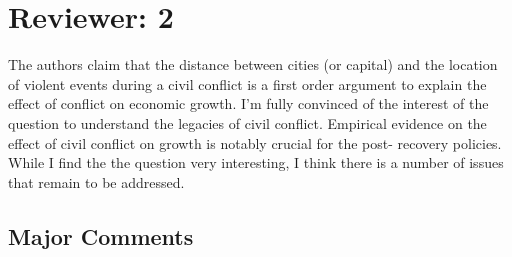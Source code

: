 \section{Reviewer: 2}
The authors claim that the distance between cities (or capital) and the location of violent events during a civil conflict is a first order argument to explain the effect of conflict on economic growth. I’m fully convinced of the interest of the question to understand the legacies of civil conflict. Empirical evidence on the effect of civil conflict on growth is notably crucial for the post- recovery policies. While I find the the question very interesting, I think there is a number of issues that remain to be addressed.

\subsection{Major Comments}

